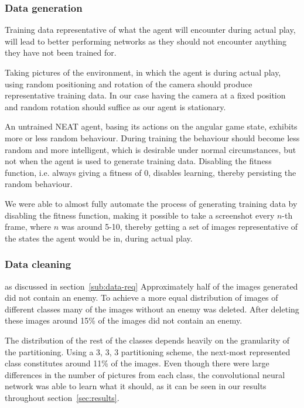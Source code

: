 \subsubsection{Data generation}
\label{subsub:data-gen}
Training data representative of what the agent will encounter during actual play, will lead to better performing networks as they should not encounter anything they have not been trained for.

Taking pictures of the environment, in which the agent is during actual play, using random positioning and rotation of the camera should produce representative training data. In our case having the camera at a fixed position and random rotation should suffice as our agent is stationary.

An untrained NEAT agent, basing its actions on the angular game state, exhibits more or less random behaviour. During training the behaviour should become less random and more intelligent, which is desirable under normal circumstances, but not when the agent is used to generate training data. Disabling the fitness function, i.e. always giving a fitness of 0, disables learning, thereby persisting the random behaviour.

We were able to almost fully automate the process of generating training data by disabling the fitness function, making it possible to take a screenshot every $n$-th frame, where $n$ was around 5-10,  thereby getting a set of images representative of the states the agent would be in, during actual play.


\subsubsection{Data cleaning}

as discussed in section~\ref{sub:data-req}
Approximately half of the images generated did not contain an enemy. To achieve a more equal distribution of images of different classes many of the images without an enemy was deleted. After deleting these images around 15\% of the images did not contain an enemy.

The distribution of the rest of the classes depends heavily on the granularity of the partitioning. Using a 3, 3, 3 partitioning scheme, the next-most represented class constitutes around 11\% of the images. Even though there were large differences in the number of pictures from each class, the convolutional neural network was able to learn what it should, as it can be seen in our results throughout section~\ref{sec:results}.


